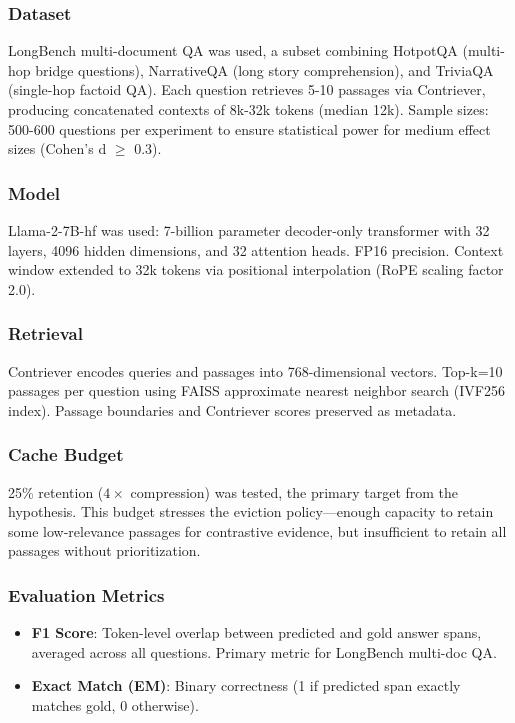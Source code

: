 
\subsubsection{Dataset}

LongBench multi-document QA was used, a subset combining HotpotQA (multi-hop bridge questions), NarrativeQA (long story comprehension), and TriviaQA (single-hop factoid QA). Each question retrieves 5-10 passages via Contriever, producing concatenated contexts of 8k-32k tokens (median 12k). Sample sizes: 500-600 questions per experiment to ensure statistical power for medium effect sizes (Cohen's d $\geq$ 0.3).

\subsubsection{Model}

Llama-2-7B-hf \citep{touvron2023llama2} was used: 7-billion parameter decoder-only transformer with 32 layers, 4096 hidden dimensions, and 32 attention heads. FP16 precision. Context window extended to 32k tokens via positional interpolation (RoPE scaling factor 2.0).

\subsubsection{Retrieval}

Contriever \citep{Izacard2021} encodes queries and passages into 768-dimensional vectors. Top-k=10 passages per question using FAISS approximate nearest neighbor search (IVF256 index). Passage boundaries and Contriever scores preserved as metadata.

\subsubsection{Cache Budget}

25\% retention ($4\times$ compression) was tested, the primary target from the hypothesis. This budget stresses the eviction policy---enough capacity to retain some low-relevance passages for contrastive evidence, but insufficient to retain all passages without prioritization.

\subsubsection{Evaluation Metrics}

\begin{itemize}
\item \textbf{F1 Score}: Token-level overlap between predicted and gold answer spans, averaged across all questions. Primary metric for LongBench multi-doc QA.
\item \textbf{Exact Match (EM)}: Binary correctness (1 if predicted span exactly matches gold, 0 otherwise).
\end{itemize}

